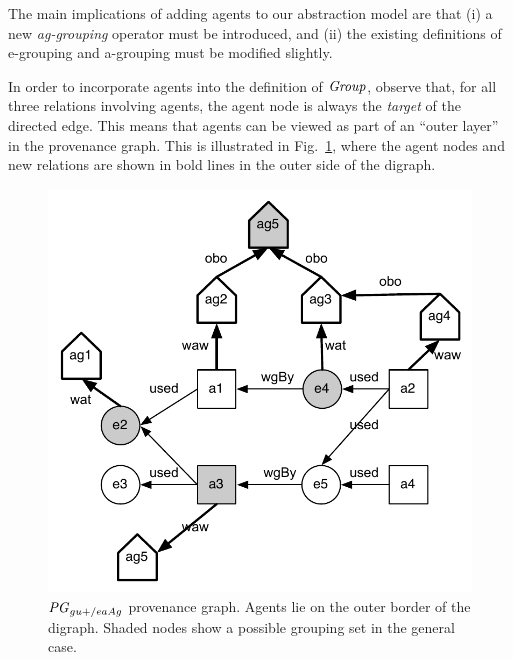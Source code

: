 The main implications of adding agents to our abstraction model are that (i) a new \textit{ag-grouping} operator must be introduced, and (ii) the existing definitions of e-grouping and a-grouping must be modified slightly. 

In order to incorporate agents into the definition of $\mathit{Group}$, observe that, for all three relations involving agents, the agent node is always the \textit{target} of the directed edge.
%
This means that agents can be viewed as part of an ``outer layer'' in the provenance graph.
%
This is illustrated in Fig.~\ref{fig:agents-baseline}, where the agent nodes and new relations are shown in bold lines in the outer side of the digraph.

\begin{figure}
\centering
\includegraphics[scale=.5]{figures/agents-baseline}
\caption{$\mathit{PG}_{gu+/eaAg}$ provenance graph. Agents lie on the outer border of the digraph. Shaded nodes show a possible grouping set in the general case.}  \label{fig:agents-baseline}
\end{figure}

